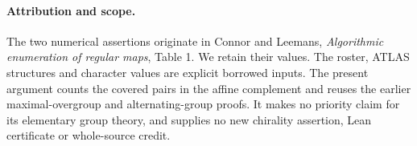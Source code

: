 \documentclass[11pt,a4paper]{article}
\begin{document}
\paragraph{Attribution and scope.}
The two numerical assertions originate in Connor and Leemans,
\emph{Algorithmic enumeration of regular maps}, Table 1. We retain
their values. The roster, ATLAS structures and character values
are explicit borrowed inputs. The present argument counts the
covered pairs in the affine complement and reuses the earlier
maximal-overgroup and alternating-group proofs. It makes no
priority claim for its elementary group theory, and supplies no
new chirality assertion, Lean certificate or whole-source credit.
\end{document}
